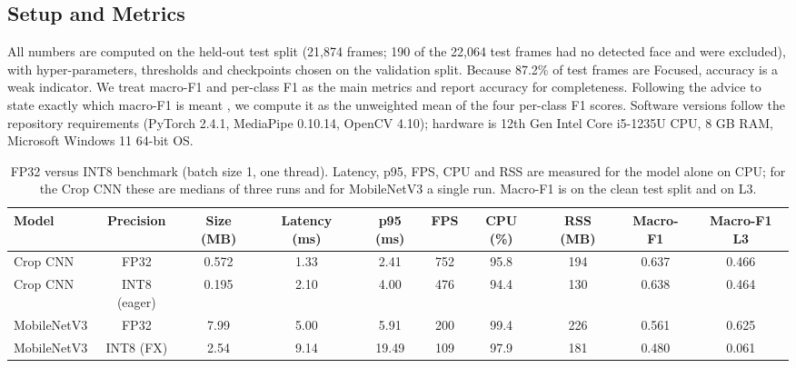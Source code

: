\documentclass[conference]{IEEEtran}
\begin{document}
\subsection{Setup and Metrics}\label{sec:setup}
All numbers are computed on the held-out test split (21,874 frames; 190 of the 22,064 test frames had no detected face and were excluded), with hyper-parameters, thresholds and checkpoints chosen on the validation split. Because 87.2\% of test frames are Focused, accuracy is a weak indicator. We treat macro-F1 and per-class F1 as the main metrics and report accuracy for completeness. Following the advice to state exactly which macro-F1 is meant \cite{opitz2024}, we compute it as the unweighted mean of the four per-class F1 scores. Software versions follow the repository requirements (PyTorch 2.4.1, MediaPipe 0.10.14, OpenCV 4.10); hardware is 12th Gen Intel Core i5-1235U CPU, 8 GB RAM, Microsoft Windows 11 64-bit OS.

\begin{table}[!t]
\centering
\caption{FP32 versus INT8 benchmark (batch size 1, one thread).
Latency, p95, FPS, CPU and RSS are measured for the model alone
on CPU; for the Crop CNN these are medians of three runs and for
MobileNetV3 a single run. Macro-F1 is on the clean test split and on L3.}
\label{tab:fp32_int8_benchmark}
\footnotesize
\setlength{\tabcolsep}{5pt}
\renewcommand{\arraystretch}{1.15}
\begin{tabular}{|l|c|c|c|c|c|c|c|c|c|}
\hline
\textbf{Model} &
\textbf{Precision} &
\textbf{Size (MB)} &
\textbf{Latency (ms)} &
\textbf{p95 (ms)} &
\textbf{FPS} &
\textbf{CPU (\%)} &
\textbf{RSS (MB)} &
\textbf{Macro-F1} &
\textbf{Macro-F1 L3} \\
\hline
Crop CNN & FP32 & 0.572 & 1.33 & 2.41 & 752 & 95.8 & 194 & 0.637 & 0.466 \\
\hline
Crop CNN & INT8 (eager) & 0.195 & 2.10 & 4.00 & 476 & 94.4 & 130 & 0.638 & 0.464 \\
\hline
MobileNetV3 & FP32 & 7.99 & 5.00 & 5.91 & 200 & 99.4 & 226 & 0.561 & 0.625 \\
\hline
MobileNetV3 & INT8 (FX) & 2.54 & 9.14 & 19.49 & 109 & 97.9 & 181 & 0.480 & 0.061 \\
\hline
\end{tabular}
\end{table}
\end{document}

